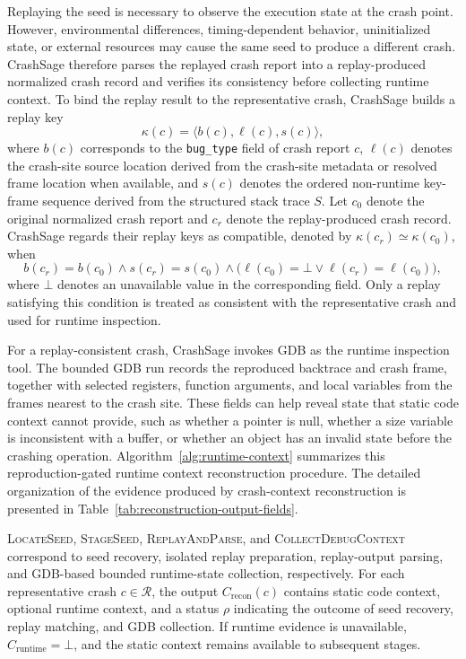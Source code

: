 \documentclass[pdflatex,sn-basic]{sn-jnl}%
\theoremstyle{thmstyleone}%
\theoremstyle{thmstyletwo}%
\theoremstyle{thmstylethree}%
\begin{document}
Replaying the seed is necessary to observe the execution state at the crash point.
However, environmental differences, timing-dependent behavior, uninitialized state, or external resources may cause the same seed to produce a different crash.
CrashSage therefore parses the replayed crash report into a replay-produced normalized crash record and verifies its consistency before collecting runtime context.
To bind the replay result to the representative crash, CrashSage builds a replay key
\begin{equation*}
\kappa(c)=\langle b(c), \ell(c), s(c) \rangle ,
\end{equation*}
where \(b(c)\) corresponds to the \texttt{bug\_type} field of crash report \(c\), \(\ell(c)\) denotes the crash-site source location derived from the crash-site metadata or resolved frame location when available, and \(s(c)\) denotes the ordered non-runtime key-frame sequence derived from the structured stack trace \(S\).
Let \(c_0\) denote the original normalized crash report and \(c_r\) denote the replay-produced crash record.
CrashSage regards their replay keys as compatible, denoted by \(\kappa(c_r)\simeq\kappa(c_0)\), when
\begin{equation*}
b(c_r)=b(c_0) \land s(c_r)=s(c_0) \land
\bigl(\ell(c_0)=\bot \lor \ell(c_r)=\ell(c_0)\bigr),
\end{equation*}
where \(\bot\) denotes an unavailable value in the corresponding field.
Only a replay satisfying this condition is treated as consistent with the representative crash and used for runtime inspection.

For a replay-consistent crash, CrashSage invokes GDB as the runtime inspection tool.
The bounded GDB run records the reproduced backtrace and crash frame, together with selected registers, function arguments, and local variables from the frames nearest to the crash site.
These fields can help reveal state that static code context cannot provide, such as whether a pointer is null, whether a size variable is inconsistent with a buffer, or whether an object has an invalid state before the crashing operation. Algorithm~\ref{alg:runtime-context} summarizes this reproduction-gated runtime context reconstruction procedure. The detailed organization of the evidence produced by crash-context reconstruction is presented in Table~\ref{tab:reconstruction-output-fields}.

\textsc{LocateSeed}, \textsc{StageSeed}, \textsc{ReplayAndParse}, and \textsc{CollectDebugContext} correspond to seed recovery, isolated replay preparation, replay-output parsing, and GDB-based bounded runtime-state collection, respectively.
For each representative crash \(c\in\mathcal{R}\), the output \(C_{\mathrm{recon}}(c)\) contains static code context, optional runtime context, and a status \(\rho\) indicating the outcome of seed recovery, replay matching, and GDB collection.
If runtime evidence is unavailable, \(C_{\mathrm{runtime}}=\bot\), and the static context remains available to subsequent stages.
\end{document}
